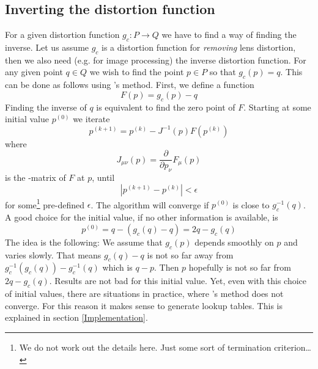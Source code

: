 \documentclass[10pt,a4paper]{article}
\newcommand{\norm}[1]{\left|#1\right|}
\begin{document}
\subsection{Inverting the distortion function}
\label{InvertingTheModel}
For a given distortion function $g_c:P\rightarrow Q$ we have to find a way of finding the inverse.
Let us assume $g_c$ is a distortion function for {\em removing} lens distortion, then we also need
(e.g. for image processing) the inverse distortion function. For any given point $q\in Q$
we wish to find the point $p\in P$ so that $g_c(p) = q$. This can be done as follows
using \Newton's method. First, we define a function
\begin{equation}
F(p) = g_c(p) - q
\end{equation}
Finding the inverse of $q$ is equivalent to find the zero point of $F$.
Starting at some initial value $p^{(0)}$ we iterate
\begin{equation}
p^{(k+1)} = p^{(k)} - J^{-1}(p) F(p^{(k)})
\end{equation}
where
\begin{equation}
J_{\mu\nu}(p) = \frac \partial {\partial p_\nu} F_\mu(p)
\end{equation}
is the \Jacobi-matrix of $F$ at $p$,
until
\begin{equation}
\norm{p^{(k+1)} - p^{(k)}} < \epsilon
\end{equation}
for some\footnote{We do not work out the details here. Just some sort of termination criterion\ldots} pre-defined $\epsilon$.
The algorithm will converge if $p^{(0)}$ is close to $g_c^{-1}(q)$.
A good choice for the initial value, if no other information is available, is
\begin{equation}
p^{(0)} = q - (g_c(q) - q) = 2q - g_c(q)
\end{equation}
The idea is the following: We assume that $g_c(p)$ depends smoothly on $p$ and varies slowly.
That means $g_c(q) - q$ is not so far away from $g_c^{-1}(g_c(q)) - g_c^{-1}(q)$ which is $q - p$.
Then $p$ hopefully is not so far from $2q - g_c(q)$. Results are not bad for this initial value.
Yet, even with this choice of initial values, there are situations in practice, where
\Newton's method does not converge. For this reason it makes sense to generate lookup tables.
This is explained in section \ref{Implementation}.
\end{document}
